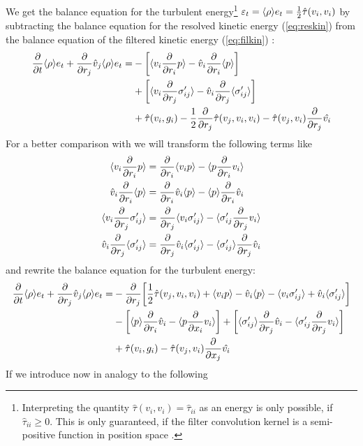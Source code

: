 We get the balance equation for the turbulent energy\footnote{Interpreting the
quantity $\hat{\tau}(v_i,v_i) = \hat{\tau}_{ii}$ as an energy is only possible,
if $\hat{\tau}_{ii} \geq 0$. This is only guaranteed, if the filter 
convolution kernel is a semi-positive function in position
space \citep{Vreman1994,Sagaut2006}.} 
$\varepsilon_t=\langle \rho \rangle e_t =\frac{1}{2}\hat{\tau}(v_i,v_i)$ by
subtracting the balance equation for the resolved kinetic energy
(\ref{eq:reskin}) from the balance equation of the filtered kinetic energy
(\ref{eq:filkin}) :
\begin{align}
\begin{split}
\frac{\partial}{\partial t}\langle \rho \rangle e_t+\frac{\partial}{\partial r_j}\hat{v}_j \langle \rho \rangle e_t=&
-{ \left[ \langle v_i \frac{\partial}{\partial r_i}p \rangle-\hat{v}_i\frac{\partial}{\partial r_i}\langle p \rangle \right] } \\
&+{ \left[ \langle v_i \frac{\partial}{\partial r_j}\sigma'_{ij} \rangle-\hat{v}_i\frac{\partial}{\partial r_j}\langle \sigma'_{ij} \rangle \right] } \\
&+\hat{\tau}(v_i,g_i) 
-\frac{1}{2}\frac{\partial}{\partial r_j}\hat{\tau}(v_j,v_i,v_i) 
-\hat{\tau}(v_j,v_i)\frac{\partial}{\partial r_j}\hat{v_i}
\end{split}
\end{align}
For a better comparison with \citet{Schmidt2006} we will transform the following
terms like
\begin{align}
\langle v_i \frac{\partial}{\partial r_i}p \rangle&=\frac{\partial}{\partial r_i}\langle v_i p \rangle-\langle p \frac{\partial}{\partial r_i} v_i \rangle
\label{eq:trans1}\\
\hat{v}_i\frac{\partial}{\partial r_i}\langle p \rangle&=\frac{\partial}{\partial r_i}\hat{v}_i\langle p \rangle-\langle p \rangle\frac{\partial}{\partial r_i}\hat{v}_i\\
\langle v_i \frac{\partial}{\partial r_j}\sigma'_{ij} \rangle&=\frac{\partial}{\partial r_j}\langle v_i \sigma'_{ij} \rangle-\langle \sigma'_{ij}
\frac{\partial}{\partial r_j}v_i \rangle\\
\hat{v}_i\frac{\partial}{\partial r_j}\langle \sigma'_{ij} \rangle&=\frac{\partial}{\partial r_j}\hat{v}_i\langle \sigma'_{ij} \rangle-\langle 
\sigma'_{ij} \rangle\frac{\partial}{\partial r_j}\hat{v}_i\label{eq:trans4}
\end{align}
and rewrite the balance equation for the turbulent energy:
\begin{align}
\begin{split}
\frac{\partial}{\partial t}\langle \rho \rangle e_t+\frac{\partial}{\partial r_j}\hat{v}_j \langle \rho \rangle e_t=&
-\frac{\partial}{\partial r_j}{ \left[ \frac{1}{2}\hat{\tau}(v_j,v_i,v_i)+\langle v_i p \rangle-\hat{v}_i\langle p \rangle
-\langle v_i \sigma'_{ij} \rangle+\hat{v}_i\langle \sigma'_{ij} \rangle \right] }\\
&-{ \left[ \langle p \rangle\frac{\partial}{\partial r_i}\hat{v}_i-\langle p \frac{\partial}{\partial x_i} v_i \rangle \right] } 
+{ \left[ \langle \sigma'_{ij} \rangle\frac{\partial}{\partial r_j}\hat{v}_i-\langle \sigma'_{ij} \frac{\partial}{\partial r_j}v_i \rangle \right] } \\
&+\hat{\tau}(v_i,g_i)-\hat{\tau}(v_j,v_i)\frac{\partial}{\partial x_j}\hat{v_i}
\end{split}
\end{align}
If we introduce now in analogy to \citet{Schmidt2006} the following

